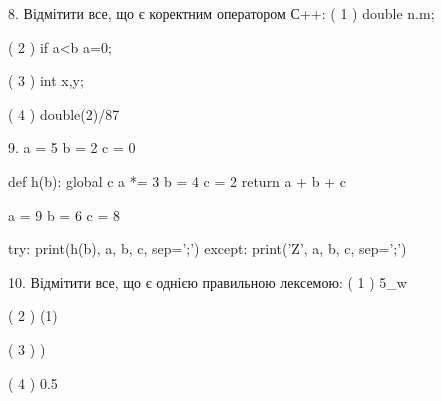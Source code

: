 \documentclass[11pt]{article}
\begin{document}
8. %
Відмітити все, що є коректним оператором С++:
( 1 ) double n.m;

( 2 ) if a<b a=0;

( 3 ) {int x,y;}

( 4 ) double(2)/87


9. 
a = 5
b = 2
c = 0

def h(b):
global c    a *= 3
    b = 4
    c = 2
    return a + b + c

a = 9
b = 6
c = 8

try:
    print(h(b), a, b, c, sep=';')
except:
    print('Z', a, b, c, sep=';')


10. %
Відмітити все, що є однією правильною лексемою:
( 1 ) 5_w

( 2 ) (1)

( 3 ) )

( 4 ) 0.5


\newpage
\end{document}
